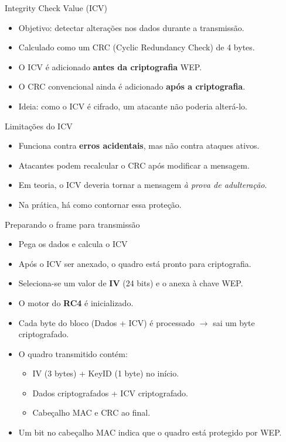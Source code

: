 \begin{frame}{Integrity Check Value (ICV)}
    \begin{itemize}
        \item Objetivo: detectar alterações nos dados durante a transmissão.
        \item Calculado como um CRC (Cyclic Redundancy Check) de 4 bytes.
        \item O ICV é adicionado \textbf{antes da criptografia} WEP.
        \item O CRC convencional ainda é adicionado \textbf{após a criptografia}.
        \item Ideia: como o ICV é cifrado, um atacante não poderia alterá-lo.
    \end{itemize}

    \begin{block}{Limitações do ICV}
        \begin{itemize}
            \item Funciona contra \textbf{erros acidentais}, mas não contra ataques ativos.
            \item Atacantes podem recalcular o CRC após modificar a mensagem.
            \item Em teoria, o ICV deveria tornar a mensagem \textit{à prova de adulteração}.
            \item Na prática, há como contornar essa proteção.
        \end{itemize}
    \end{block}
\end{frame}

\begin{frame}{Preparando o frame para transmissão}
    \begin{itemize}
        \item Pega os dados e calcula o ICV
        \item Após o ICV ser anexado, o quadro está pronto para criptografia.
        \item Seleciona-se um valor de \textbf{IV} (24 bits) e o anexa à chave WEP.
        \item O motor do \textbf{RC4} é inicializado.
        \item Cada byte do bloco (Dados + ICV) é processado $\rightarrow$ sai um byte criptografado.
        \item O quadro transmitido contém:
              \begin{itemize}
                  \item IV (3 bytes) + KeyID (1 byte) no início.
                  \item Dados criptografados + ICV criptografado.
                  \item Cabeçalho MAC e CRC ao final.
              \end{itemize}
        \item Um bit no cabeçalho MAC indica que o quadro está protegido por WEP.
    \end{itemize}
\end{frame}

